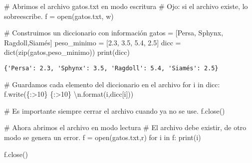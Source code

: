 \documentclass[
  letterpaper,
  DIV=11,
  numbers=noendperiod]{scrreprt}
\newenvironment{Shaded}{\begin{snugshade}}{\end{snugshade}}
\newcommand{\BuiltInTok}[1]{\textcolor[rgb]{0.00,0.23,0.31}{#1}}
\newcommand{\CharTok}[1]{\textcolor[rgb]{0.13,0.47,0.30}{#1}}
\newcommand{\CommentTok}[1]{\textcolor[rgb]{0.37,0.37,0.37}{#1}}
\newcommand{\ControlFlowTok}[1]{\textcolor[rgb]{0.00,0.23,0.31}{#1}}
\newcommand{\FloatTok}[1]{\textcolor[rgb]{0.68,0.00,0.00}{#1}}
\newcommand{\KeywordTok}[1]{\textcolor[rgb]{0.00,0.23,0.31}{#1}}
\newcommand{\NormalTok}[1]{\textcolor[rgb]{0.00,0.23,0.31}{#1}}
\newcommand{\OperatorTok}[1]{\textcolor[rgb]{0.37,0.37,0.37}{#1}}
\newcommand{\SpecialCharTok}[1]{\textcolor[rgb]{0.37,0.37,0.37}{#1}}
\newcommand{\StringTok}[1]{\textcolor[rgb]{0.13,0.47,0.30}{#1}}
\begin{document}
\begin{Shaded}
\begin{Highlighting}[]
\CommentTok{\# Abrimos el archivo gatos.txt en modo escritura}
\CommentTok{\# Ojo: si el archivo existe, lo sobreescribe.}
\NormalTok{f }\OperatorTok{=} \BuiltInTok{open}\NormalTok{(}\StringTok{\textquotesingle{}gatos.txt\textquotesingle{}}\NormalTok{, }\StringTok{\textquotesingle{}w\textquotesingle{}}\NormalTok{)}
\end{Highlighting}
\end{Shaded}

\begin{Shaded}
\begin{Highlighting}[]
\CommentTok{\# Construimos un diccionario con información}
\NormalTok{gatos }\OperatorTok{=}\NormalTok{ [}\StringTok{\textquotesingle{}Persa\textquotesingle{}}\NormalTok{, }\StringTok{\textquotesingle{}Sphynx\textquotesingle{}}\NormalTok{, }\StringTok{\textquotesingle{}Ragdoll\textquotesingle{}}\NormalTok{,}\StringTok{\textquotesingle{}Siamés\textquotesingle{}}\NormalTok{]}
\NormalTok{peso\_minimo }\OperatorTok{=}\NormalTok{ [}\FloatTok{2.3}\NormalTok{, }\FloatTok{3.5}\NormalTok{, }\FloatTok{5.4}\NormalTok{, }\FloatTok{2.5}\NormalTok{]}
\NormalTok{dicc }\OperatorTok{=} \BuiltInTok{dict}\NormalTok{(}\BuiltInTok{zip}\NormalTok{(gatos,peso\_minimo))}
\BuiltInTok{print}\NormalTok{(dicc)}
\end{Highlighting}
\end{Shaded}

\begin{verbatim}
{'Persa': 2.3, 'Sphynx': 3.5, 'Ragdoll': 5.4, 'Siamés': 2.5}
\end{verbatim}

\begin{Shaded}
\begin{Highlighting}[]
\CommentTok{\# Guardamos cada elemento del diccionario en el archivo}
\ControlFlowTok{for}\NormalTok{ i }\KeywordTok{in}\NormalTok{ dicc:}
\NormalTok{    f.write(}\StringTok{\textquotesingle{}}\SpecialCharTok{\{:\textgreater{}10\}}\StringTok{ }\SpecialCharTok{\{:\textgreater{}10\}}\StringTok{ }\CharTok{\textbackslash{}n}\StringTok{\textquotesingle{}}\NormalTok{.}\BuiltInTok{format}\NormalTok{(i,dicc[i]))}

\CommentTok{\# Es importante siempre cerrar el archivo cuando ya no se use.}
\NormalTok{f.close()}
\end{Highlighting}
\end{Shaded}

\begin{Shaded}
\begin{Highlighting}[]
\CommentTok{\# Ahora abrimos el archivo en modo lectura}
\CommentTok{\# El archivo debe existir, de otro modo se genera un error.}
\NormalTok{f }\OperatorTok{=} \BuiltInTok{open}\NormalTok{(}\StringTok{\textquotesingle{}gatos.txt\textquotesingle{}}\NormalTok{,}\StringTok{\textquotesingle{}r\textquotesingle{}}\NormalTok{)}
\ControlFlowTok{for}\NormalTok{ i }\KeywordTok{in}\NormalTok{ f:}
    \BuiltInTok{print}\NormalTok{(i)}
    
\NormalTok{f.close()}
\end{Highlighting}
\end{Shaded}
\end{document}
